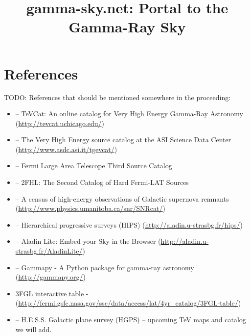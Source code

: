 \documentclass{aip-cp}
\begin{document}
\title{gamma-sky.net: Portal to the Gamma-Ray Sky}


\maketitle

\begin{abstract}

\end{abstract}

\section{References}

TODO: References that should be mentioned somewhere in the proceeding:

\begin{itemize}
    \item \cite{tevcat} -- TeVCat: An online catalog for Very High Energy Gamma-Ray Astronomy (\url{http://tevcat.uchicago.edu/})
    \item \cite{tgevcat} -- The Very High Energy source catalog at the ASI Science Data Center (\url{http://www.asdc.asi.it/tgevcat/})
    \item \cite{3fgl} -- Fermi Large Area Telescope Third Source Catalog 
    \item \cite{2fhl} -- 2FHL: The Second Catalog of Hard Fermi-LAT Sources
    \item \cite{snrcat} -- A census of high-energy observations of Galactic supernova remnants (\url{http://www.physics.umanitoba.ca/snr/SNRcat/})
    \item \cite{hips} -- Hierarchical progressive surveys (HIPS) (\url{http://aladin.u-strasbg.fr/hips/})
    \item \cite{aladin-lite} -- Aladin Lite: Embed your Sky in the Browser (\url{http://aladin.u-strasbg.fr/AladinLite/})
    \item \cite{gammapy} -- Gammapy - A Python package for gamma-ray astronomy (\url{http://gammapy.org/})
    \item 3FGL interactive table - (\url{http://fermi.gsfc.nasa.gov/ssc/data/access/lat/4yr_catalog/3FGL-table/})
    \item \cite{hgps} -- H.E.S.S. Galactic plane survey (HGPS) -- upcoming TeV maps and catalog we will add.
\end{itemize}











\nocite{*}


\end{document}
